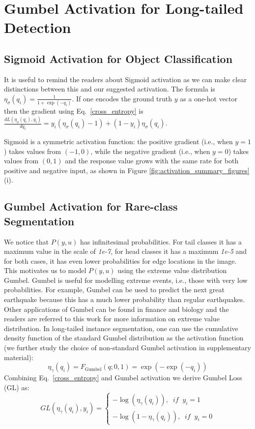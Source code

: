 \documentclass[runningheads]{llncs}
\begin{document}
\section{Gumbel Activation for Long-tailed Detection}
\label{sec:methodology}

\subsection{Sigmoid Activation for Object Classification}
It is useful to remind the readers about Sigmoid activation as we can make clear distinctions between this and our suggested activation. The formula is  $\eta_{\sigma}(q_i)=\frac{1}{1+\exp(-q_i)}$.
If one encodes the ground truth $y$ as a one-hot vector then the gradient using Eq.~\ref{cross_entropy} is $\frac{dL(\eta_{\sigma}(q_i),y_i)}{dq_i}=y_i(\eta_{\sigma}(q_i)-1)+(1-y_i)\eta_{\sigma}(q_i)$.

Sigmoid is a symmetric activation function: the positive gradient (i.e.,  when $y=1$) takes values from $(-1,0)$, while the negative gradient (i.e.,  when $y=0$) takes values from $(0,1)$ and the response value grows with the same rate for both positive and negative input, as shown in Figure \ref{fig:activation_summary_figures}(i).

\subsection{Gumbel Activation for Rare-class Segmentation}
\label{gumbel_methodology}
We notice that $P(y,u)$ has infinitesimal probabilities. For tail classes it has a maximum value in the scale of \textit{1e-7}, for head classes it has a maximum \textit{1e-5} and for both cases, it has even lower probabilities for edge locations in the image. This motivates us to model $P(y,u)$ using the extreme value distribution Gumbel. Gumbel is useful for modelling extreme events, i.e., those with very low probabilities. For example, Gumbel can be used to predict the next great earthquake because this has a much lower probability than regular earthquakes. Other applications of Gumbel can be found in finance and biology and the readers are referred to this work \cite{kotz2000extreme} for more information on extreme value distribution. In long-tailed  instance segmentation, one can use the cumulative density function of the standard Gumbel distribution as the activation function (we further study the choice of non-standard Gumbel activation in supplementary material):
\begin{equation}
    \eta_{\gamma}(q_i)=F_{\text{Gumbel}}(q;0,1)=\exp(-\exp(-q_i))
\label{gumbel_activation}
\end{equation}
Combining Eq.~\ref{cross_entropy} and Gumbel activation we derive Gumbel Loss (GL) as:
\begin{equation}
    GL(\eta_{\gamma}(q_i),y_i)= 
    \begin{cases}
        -\log(\eta_{\gamma}(q_i)),\;\; if \;\;  y_i=1\\
        -\log(1-\eta_{\gamma}(q_i)),\;\;  if\;\;  y_i=0
    \end{cases}
    \label{gumbel_loss}
\end{equation}
\end{document}
